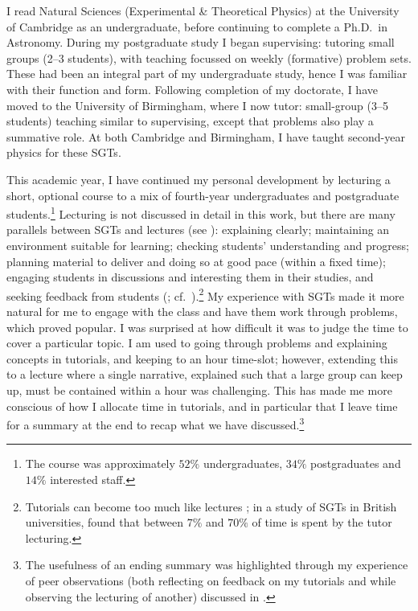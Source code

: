 I read Natural Sciences (Experimental \& Theoretical Physics) at the University of Cambridge as an undergraduate, before continuing to complete a Ph.D.\ in Astronomy. During my postgraduate study I began supervising: tutoring small groups (2--3 students), with teaching focussed on weekly (formative) problem sets. These had been an integral part of my undergraduate study, hence I was familiar with their function and form. Following completion of my doctorate, I have moved to the University of Birmingham, where I now tutor: small-group (3--5 students) teaching similar to supervising, except that problems also play a summative role. At both Cambridge and Birmingham, I have taught second-year physics for these SGTs.

This academic year, I have continued my personal development by lecturing a short, optional course to a mix of fourth-year undergraduates and postgraduate students.\footnote{The course was approximately $52\%$ undergraduates, $34\%$ postgraduates and $14\%$ interested staff.} Lecturing is not discussed in detail in this work, but there are many parallels between SGTs and lectures (see ): explaining clearly; maintaining an environment suitable for learning; checking students' understanding and progress; planning material to deliver and doing so at good pace (within a fixed time); engaging students in discussions and interesting them in their studies, and seeking feedback from students (\citealt[chapter 3]{Brown1988}; cf.\ \citealt[chapter 6]{Ramsden1992}).\footnote{Tutorials can become too much like lectures \citep[chapter 9]{Ramsden1992}; in a study of SGTs in British universities, \citet[quoted in \citealt{Brown1988}, chapter 4]{Luker1987} found that between $7\%$ and $70\%$ of time is spent by the tutor lecturing.} My experience with SGTs made it more natural for me to engage with the class and have them work through problems, which proved popular. I was surprised at how difficult it was to judge the time to cover a particular topic. I am used to going through problems and explaining concepts in tutorials, and keeping to an hour time-slot; however, extending this to a lecture where a single narrative, explained such that a large group can keep up, must be contained within a hour was challenging. This has made me more conscious of how I allocate time in tutorials, and in particular that I leave time for a summary at the end to recap what we have discussed.\footnote{The usefulness of an ending summary was highlighted through my experience of peer observations (both reflecting on feedback on my tutorials and while observing the lecturing of another) discussed in .}

